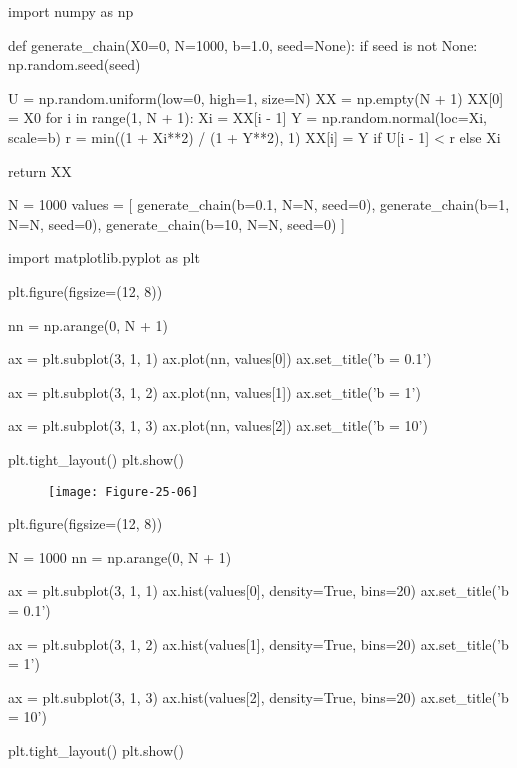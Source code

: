 \begin{python}
import numpy as np

def generate_chain(X0=0, N=1000, b=1.0, seed=None):
    if seed is not None:
        np.random.seed(seed)
        
    U = np.random.uniform(low=0, high=1, size=N)
    XX = np.empty(N + 1)
    XX[0] = X0
    for i in range(1, N + 1):
        Xi = XX[i - 1]
        Y = np.random.normal(loc=Xi, scale=b)
        r = min((1 + Xi**2) / (1 + Y**2), 1)
        XX[i] = Y if U[i - 1] < r else Xi
        
    return XX
\end{python}

\begin{python}
N = 1000
values = [
    generate_chain(b=0.1, N=N, seed=0),
    generate_chain(b=1, N=N, seed=0),
    generate_chain(b=10, N=N, seed=0)
]
\end{python}

\begin{python}
import matplotlib.pyplot as plt

plt.figure(figsize=(12, 8))

nn = np.arange(0, N + 1)

ax = plt.subplot(3, 1, 1)
ax.plot(nn, values[0])
ax.set_title('b = 0.1')

ax = plt.subplot(3, 1, 2)
ax.plot(nn, values[1])
ax.set_title('b = 1')

ax = plt.subplot(3, 1, 3)
ax.plot(nn, values[2])
ax.set_title('b = 10')

plt.tight_layout()
plt.show()
\end{python}

\begin{figure}[H]
\centering
\texttt{[image: Figure-25-06]}
\end{figure}

\begin{python}
plt.figure(figsize=(12, 8))

N = 1000
nn = np.arange(0, N + 1)

ax = plt.subplot(3, 1, 1)
ax.hist(values[0], density=True, bins=20)
ax.set_title('b = 0.1')

ax = plt.subplot(3, 1, 2)
ax.hist(values[1], density=True, bins=20)
ax.set_title('b = 1')

ax = plt.subplot(3, 1, 3)
ax.hist(values[2], density=True, bins=20)
ax.set_title('b = 10')

plt.tight_layout()
plt.show()
\end{python}

